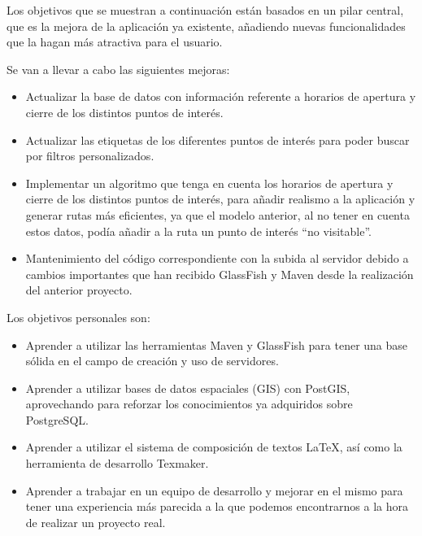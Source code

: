 
Los objetivos que se muestran a continuación están basados en un pilar central, que es la mejora de la aplicación ya existente, añadiendo nuevas funcionalidades que la hagan más atractiva para el usuario.

Se van a llevar a cabo las siguientes mejoras:
\begin{itemize}
\item Actualizar la base de datos con información referente a horarios de apertura y cierre de los distintos puntos de interés.
\item Actualizar las etiquetas de los diferentes puntos de interés para poder buscar por filtros personalizados.
\item Implementar un algoritmo que tenga en cuenta los horarios de apertura y cierre de los distintos puntos de interés, para añadir realismo a la aplicación y generar rutas más eficientes, ya que el modelo anterior, al no tener en cuenta estos datos, podía añadir a la ruta un punto de interés ``no visitable''.
\item Mantenimiento del código correspondiente con la subida al servidor debido a cambios importantes que han recibido GlassFish y Maven desde la realización del anterior proyecto.
\end{itemize}

Los objetivos personales son:
\begin{itemize}
\item Aprender a utilizar las herramientas Maven y GlassFish para tener una base sólida en el campo de creación y uso de servidores.
\item Aprender a utilizar bases de datos espaciales (GIS) con PostGIS, aprovechando para reforzar los conocimientos ya adquiridos sobre PostgreSQL.
\item Aprender a utilizar el sistema de composición de textos LaTeX, así como la herramienta de desarrollo Texmaker.
\item Aprender a trabajar en un equipo de desarrollo y mejorar en el mismo para tener una experiencia más parecida a la que podemos encontrarnos a la hora de realizar un proyecto real.
\end{itemize}